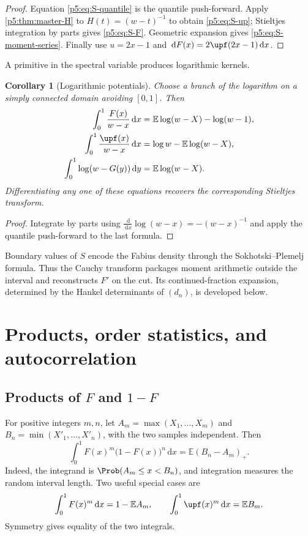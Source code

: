 \documentclass[11pt,oneside]{article}
\newtheorem{corollary}[theorem]{Corollary}
\theoremstyle{definition}
\theoremstyle{remark}
\newcommand{\E}{\mathbb E}
\newcommand{\dd}{\,\mathrm d}
\newcommand{\1}{\mathbf 1}
\begin{document}
\begin{proof}
Equation \eqref{p5:eq:S-quantile} is the quantile push-forward.  Apply \cref{p5:thm:master-H} to $H(t)=(w-t)^{-1}$ to obtain \eqref{p5:eq:S-up}; Stieltjes integration by parts gives \eqref{p5:eq:S-F}.  Geometric expansion gives \eqref{p5:eq:S-moment-series}.  Finally use $u=2x-1$ and $\dd F(x)=2\upf(2x-1)\dd x$.
\end{proof}

A primitive in the spectral variable produces logarithmic kernels.

\begin{corollary}[Logarithmic potentials]\label{p5:cor:logarithmic-potentials}
Choose a branch of the logarithm on a simply connected domain avoiding $[0,1]$.  Then
\begin{align}
 \int_0^1\frac{F(x)}{w-x}\dd x
 &=\E\log(w-X)-\log(w-1),\label{p5:eq:log-potential-F}\\
 \int_0^1\frac{\upf(x)}{w-x}\dd x
 &=\log w-\E\log(w-X),\label{p5:eq:log-potential-up}\\
 \int_0^1\log(w-G(y))\dd y
 &=\E\log(w-X).\label{p5:eq:log-potential-G}
\end{align}
Differentiating any one of these equations recovers the corresponding Stieltjes transform.
\end{corollary}

\begin{proof}
Integrate by parts using $\frac{\dd}{\dd x}\log(w-x)=-(w-x)^{-1}$ and apply the quantile push-forward to the last formula.
\end{proof}

Boundary values of $S$ encode the Fabius density through the Sokhotski--Plemelj formula.  Thus the Cauchy transform packages moment arithmetic outside the interval and reconstructs $F'$ on the cut.  Its continued-fraction expansion, determined by the Hankel determinants of $(d_n)$, is developed below.

\section{Products, order statistics, and autocorrelation}\label{p5:sec:products-correlations}

\subsection{Products of $F$ and $1-F$}

For positive integers $m,n$, let $A_m=\max(X_1,\ldots,X_m)$ and $B_n=\min(X'_1,\ldots,X'_n)$, with the two samples independent.  Then
\begin{equation}\label{p5:eq:order-statistic-product}
 \int_0^1F(x)^m\bigl(1-F(x)\bigr)^n\dd x
 =\E(B_n-A_m)_+.
\end{equation}
Indeed, the integrand is $\Prob(A_m\le x<B_n)$, and integration measures the random interval length.  Two useful special cases are
\begin{equation}\label{p5:eq:powers-order-statistics}
 \int_0^1F(x)^m\dd x=1-\E A_m,
 \qquad
 \int_0^1\upf(x)^m\dd x=\E B_m.
\end{equation}
Symmetry gives equality of the two integrals.
\end{document}
